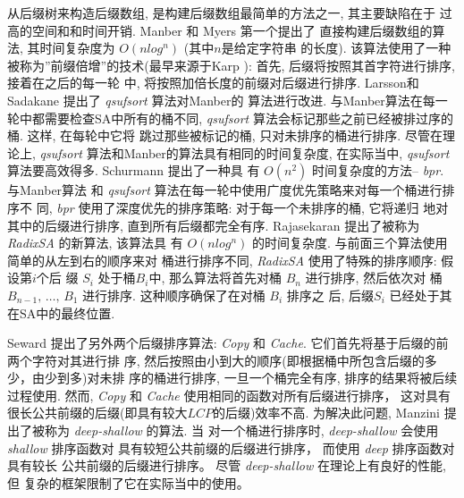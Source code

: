 \documentclass{ws-ijprai}
\begin{document}
从后缀树来构造后缀数组, 是构建后缀数组最简单的方法之一, 其主要缺陷在于
过高的空间和和时间开销. Manber 和 Myers \cite{Manber1993} 第一个提出了
直接构建后缀数组的算法, 其时间复杂度为 $O(nlog^n)$ (其中$n$是给定字符串
的长度). 该算法使用了一种被称为''前缀倍增''的技术(最早来源于Karp
\cite{Karp1972}): 首先, 后缀将按照其首字符进行排序, 接着在之后的每一轮
中, 将按照加倍长度的前缀对后缀进行排序.
Larsson和Sadakane\cite{Larsson2007} 提出了 \emph{qsufsort} 算法对Manber的
算法进行改进. 与Manber算法在每一轮中都需要检查SA中所有的桶不同,
\emph{qsufsort} 算法会标记那些之前已经被排过序的桶. 这样, 在每轮中它将
跳过那些被标记的桶, 只对未排序的桶进行排序. 尽管在理论上,
\emph{qsufsort} 算法和Manber的算法具有相同的时间复杂度, 在实际当中,
\emph{qsufsort}算法要高效得多. Schurmann\cite{Schurmann2007} 提出了一种具
有 $O(n^2)$ 时间复杂度的方法-- \emph{bpr}. 与Manber算法
和 \emph{qsufsort} 算法在每一轮中使用广度优先策略来对每一个桶进行排序不
同, \emph{bpr} 使用了深度优先的排序策略: 对于每一个未排序的桶, 它将递归
地对其中的后缀进行排序, 直到所有后缀都完全有序.  Rajasekaran
\cite{Rajasekaran2014} 提出了被称为 \emph{RadixSA} 的新算法, 该算法具
有 $O(nlog^n)$ 的时间复杂度. 与前面三个算法使用简单的从左到右的顺序来对
桶进行排序不同, \emph{RadixSA} 使用了特殊的排序顺序: 假设第$i$个后
缀 $S_i$ 处于桶$B_i$中, 那么算法将首先对桶 $B_n$ 进行排序, 然后依次对
桶 $B_{n-1},\,\dots,\, B_1$ 进行排序. 这种顺序确保了在对桶 $B_i$ 排序之
后, 后缀$S_i$ 已经处于其在SA中的最终位置.

Seward \cite{Seward2000} 提出了另外两个后缀排序算法:
\emph{Copy} 和 \emph{Cache}. 它们首先将基于后缀的前两个字符对其进行排
序, 然后按照由小到大的顺序(即根据桶中所包含后缀的多少，由少到多)对未排
序的桶进行排序, 一旦一个桶完全有序, 排序的结果将被后续过程使用. 然而,
\emph{Copy} 和 \emph{Cache} 使用相同的函数对所有后缀进行排序， 这对具有
很长公共前缀的后缀(即具有较大$LCP$的后缀)效率不高. 为解决此问题,
Manzini \cite{Manzini2004} 提出了被称为 \emph{deep-shallow} 的算法. 当
对一个桶进行排序时, \emph{deep-shallow} 会使用\emph{shallow} 排序函数对
具有较短公共前缀的后缀进行排序， 而使用 \emph{deep} 排序函数对具有较长
公共前缀的后缀进行排序。 尽管 \emph{deep-shallow} 在理论上有良好的性能,但
复杂的框架限制了它在实际当中的使用。
\end{document}
